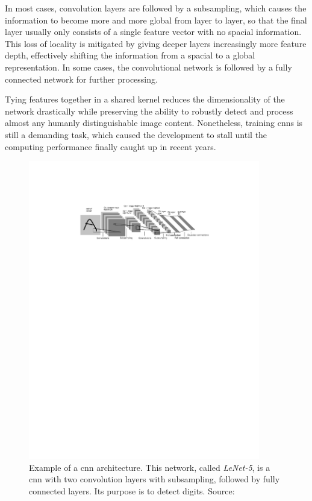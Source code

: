 In most cases, convolution layers are followed by a subsampling, which causes the information to become more and more global from layer to layer, so that the final layer usually only consists of a single feature vector with no spacial information. This loss of locality is mitigated by giving deeper layers increasingly more feature depth, effectively shifting the information from a spacial to a global representation. In some cases, the convolutional network is followed by a fully connected network for further processing.

Tying features together in a shared kernel reduces the dimensionality of the network drastically while preserving the ability to robustly detect and process almost any humanly distinguishable image content. Nonetheless, training \glspl{cnn} is still a demanding task, which caused the development to stall until the computing performance finally caught up in recent years.

\begin{figure}
  \centering
  \includegraphics[width=0.9\textwidth]{../assets/background/cnn.pdf}
  \caption[Example of a \gls{cnn} architecture]{Example of a \gls{cnn} architecture. This network, called \emph{LeNet-5}, is a \gls{cnn} with two convolution layers with subsampling, followed by fully connected layers. Its purpose is to detect digits. Source:~\cite{cnn}}
  \label{fig:cnn}
\end{figure}


